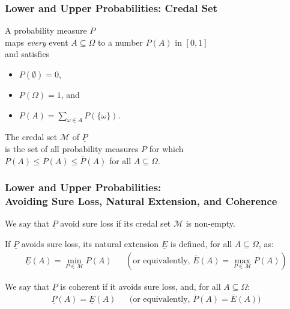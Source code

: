 \documentclass{beamer}
\newcommand{\pr}{P}
\newcommand{\lpr}{\underline{P}}
\newcommand{\upr}{\overline{P}}
\newcommand{\lnex}{\underline{E}}
\newcommand{\unex}{\overline{E}}
\begin{document}
\begin{frame}
  \frametitle{Lower and Upper Probabilities: Credal Set}
  \begin{definition}
    A \alert{probability measure} $\pr$
    \\
    maps
    \textit{every}
    event $A\subseteq\Omega$ to a number $\pr(A)$
    in $[0,1]$
    \\
    and satisfies
    \begin{itemize}
    \item $\pr(\emptyset)=0$,
    \item $\pr(\Omega)=1$, and
    \item $\pr(A)=\sum_{\omega\in A}\pr(\{\omega\})$.
    \end{itemize}
  \end{definition}
  \begin{definition}
    The \alert{credal set} $\mathcal{M}$
    of $\lpr$
    \\ is the set of all probability measures $\pr$ for which
    \\ 
    $\lpr(A)\le\pr(A)\le\upr(A)$ for all $A\subseteq\Omega$.
  \end{definition}
\end{frame}

\begin{frame}
  \frametitle{Lower and Upper Probabilities: \\
    Avoiding Sure Loss, Natural Extension, and Coherence}
  \begin{definition}
    We say that $\lpr$ \alert{avoid sure loss} if its credal set $\mathcal{M}$ is non-empty.
  \end{definition}
  \begin{definition}
    If $\lpr$ avoids sure loss, its \alert{natural extension} $\lnex$ is defined, for all $A\subseteq\Omega$, as:
    \begin{align*}
      \lnex(A)=\min_{\pr\in\mathcal{M}}\pr(A)
      &&
      \left(\text{or equivalently, }\unex(A)=\max_{\pr\in\mathcal{M}}\pr(A)\right)
    \end{align*}
  \end{definition}
  \begin{definition}
    We say that $\lpr$ is \alert{coherent} if it avoids sure loss, and, for all $A\subseteq\Omega$:
    \begin{align*}
      \lpr(A)=\lnex(A)
      &&
      \Big(\text{or equivalently, }\upr(A)=\unex(A)\Big)
    \end{align*}
  \end{definition}
\end{frame}
\end{document}
